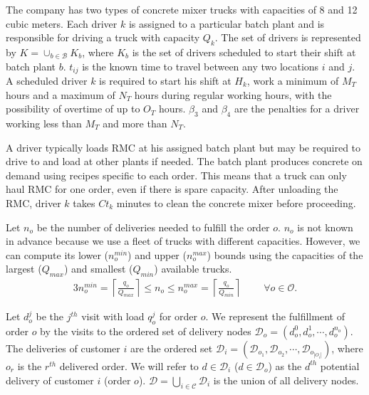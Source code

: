 \documentclass{article}
\begin{document}

The company has two types of concrete mixer trucks with capacities of 8 and 12 cubic meters. Each driver $k$ is assigned to a particular batch plant and is responsible for driving a truck with capacity $Q_k$. The set of drivers is represented by $K =\cup_{b \in \mathcal{B}}K_b $, where $K_b$ is the set of drivers scheduled to start their shift at batch plant $b$. $t_{ij}$ is the known time to travel between any two locations $i$ and $j$. A scheduled driver $k$ is required to start his shift at $H_k$, work a minimum of $M_T$ hours and a maximum of $N_T$ hours during regular working hours, with the possibility of overtime of up to $O_T$ hours. $\beta_3$ and $\beta_4$ are the penalties for a driver working less than $M_T$ and more than $N_T$.

A driver typically loads RMC at his assigned batch plant but may be required to drive to and load at other plants if needed. The batch plant produces concrete on demand using recipes specific to each order. This means that a truck can only haul RMC for one order, even if there is spare capacity.  After unloading the RMC,  driver $k$ takes $Ct_k$ minutes to clean the concrete mixer before proceeding. %

Let $n_o$ be the number of deliveries needed to fulfill the order $o$. $n_o$ is not known in advance because we use a fleet of trucks with different capacities. However, we can compute its lower ($n_o^{min}$) and upper ($n_o^{max}$) bounds using the capacities of the largest ($Q_{max}$) and smallest ($Q_{min}$) available trucks.
\begin{alignat}{3}
    \label{mod:c0}
    n_o^{min} = \left\lceil \frac{q_o}{Q_{max}} \right\rceil \leq n_o \leq n_o^{max} = \left\lceil \frac{q_o}{Q_{min}} \right\rceil & \text{ } &
    \forall  o \in \mathcal{O}.
\end{alignat}

Let $d^j_{o}$ be the $j^{th}$ visit with load $q^j_{o}$ for order $o$. We represent the fulfillment of order $o$ by the visits to the ordered set of delivery nodes $\mathcal{D}_o= \left(d^0_{o},d^1_{o},\cdots, d^{n_o}_{o}\right)$. The deliveries of customer $i$ are the ordered set $\mathcal{D}_i= (\mathcal{D}_{o_1}, \mathcal{D}_{o_2},\cdots,\mathcal{D}_{o_{|O_i|}})$, where $o_r$ is the $r^{th}$ delivered order. We will refer to $d \in \mathcal{D}_i$ ($d \in \mathcal{D}_o$) as the $d^{th}$ potential delivery of customer $i$ (order $o$). $\mathcal{D}=\bigcup_{i\in \mathcal{C}} \mathcal{D}_i$ is the union of all delivery nodes.
\end{document}
